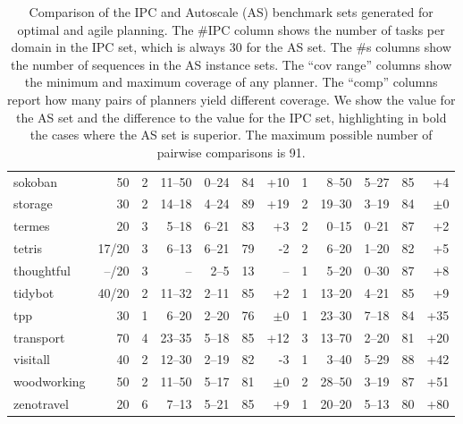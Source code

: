 \documentclass{article}
\begin{document}
\begin{table}[h]
\begin{tabular}{@{}lr|rrrrr|rrrrr@{}}
      sokoban &    50 &   2 &  11--50 &  0--24 & 84 & {\color{blue}+10} &   1 &    8--50 &  5--27 & 85 &  {\color{blue}+4} \\
      storage &    30 &   2 &  14--18 &  4--24 & 89 & {\color{blue}+19} &   2 &   19--30 &  3--19 & 84 &           $\pm 0$ \\
       termes &    20 &   3 &   5--18 &  6--21 & 83 &  {\color{blue}+3} &   2 &    0--15 &  0--21 & 87 &  {\color{blue}+2} \\
       tetris & 17/20 &   3 &   6--13 &  6--21 & 79 &   {\color{red}-2} &   2 &    6--20 &  1--20 & 82 &  {\color{blue}+5} \\
   thoughtful & --/20 &   3 &      -- &   2--5 & 13 &                -- &   1 &    5--20 &  0--30 & 87 &  {\color{blue}+8} \\
      tidybot & 40/20 &   2 &  11--32 &  2--11 & 85 &  {\color{blue}+2} &   1 &   13--20 &  4--21 & 85 &  {\color{blue}+9} \\
          tpp &    30 &   1 &   6--20 &  2--20 & 76 &           $\pm 0$ &   1 &   23--30 &  7--18 & 84 & {\color{blue}+35} \\
    transport &    70 &   4 &  23--35 &  5--18 & 85 & {\color{blue}+12} &   3 &   13--70 &  2--20 & 81 & {\color{blue}+20} \\
     visitall &    40 &   2 &  12--30 &  2--19 & 82 &   {\color{red}-3} &   1 &    3--40 &  5--29 & 88 & {\color{blue}+42} \\
  woodworking &    50 &   2 &  11--50 &  5--17 & 81 &           $\pm 0$ &   2 &   28--50 &  3--19 & 87 & {\color{blue}+51} \\
   zenotravel &    20 &   6 &   7--13 &  5--21 & 85 &  {\color{blue}+9} &   1 &   20--20 &  5--13 & 80 & {\color{blue}+80} \\
\bottomrule
\end{tabular}


            \caption{ Comparison of the IPC and Autoscale (AS) benchmark sets generated for optimal and agile planning.
             The \#IPC column shows the number of tasks per domain in the IPC set, which
            is always 30 for the AS set. The \#s columns show the number of sequences in the
            AS instance sets.  The ``cov range'' columns show the minimum and maximum
            coverage of any planner. The ``comp'' columns report how many pairs of planners yield
            different coverage. We show the value for the AS set and the difference
            to the value for the IPC set, highlighting in bold the cases where the AS
            set is superior. The maximum possible number of pairwise comparisons is 91.}
            \vspace{-10cm}
            \end{table}
\end{document}
